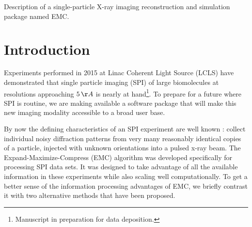 \documentclass[]{iucr}              %
\begin{document}

\maketitle                        %

\begin{synopsis}
Description of a single-particle X-ray imaging reconstruction and simulation package named EMC.
\end{synopsis}

\begin{abstract}

\end{abstract}



\section{Introduction}

Experiments performed in 2015 at Linac Coherent Light Source (LCLS) \cite{Aquila2015} have demonstrated that single particle imaging (SPI) of large biomolecules at resolutions approaching $5 \,\AA$ is nearly at hand\footnote{Manuscript in preparation for data deposition.}. To prepare for a future where SPI is routine, we are making available a software package that will make this new imaging modality accessible to a broad user base.

By now the defining characteristics of an SPI experiment are well known \cite{Neutze2000}: collect individual noisy diffraction patterns from very many reasonably identical copies of a particle, injected with unknown orientations into a pulsed x-ray beam. The Expand-Maximize-Compress (EMC) algorithm \cite{loh2009} was developed specifically for processing SPI data sets. It was designed to take advantage of all the available information in these experiments while also scaling well computationally. To get a better sense of the information processing advantages of EMC, we briefly contrast it with two alternative methods that have been proposed.
\end{document}

